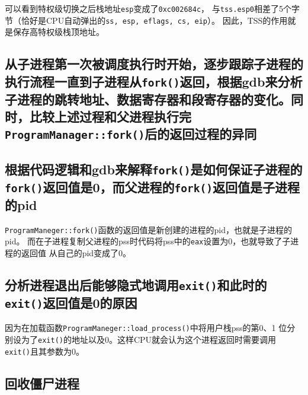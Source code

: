 可以看到特权级切换之后栈地址\texttt{esp}变成了\texttt{0xc002684c}，
与\texttt{tss.esp0}相差了5个字节（恰好是CPU自动弹出的\texttt{ss, esp, eflags, cs, eip}）。
因此，TSS的作用就是保存高特权级栈顶地址。

\subsection{从子进程第一次被调度执行时开始，逐步跟踪子进程的执行流程一直到子进程从\texttt{fork()}返回，根据gdb来分析子进程的跳转地址、数据寄存器和段寄存器的变化。同时，比较上述过程和父进程执行完\texttt{ProgramManager::fork()}后的返回过程的异同}

\subsection{根据代码逻辑和gdb来解释\texttt{fork()}是如何保证子进程的\texttt{fork()}返回值是0，而父进程的\texttt{fork()}返回值是子进程的pid}

\texttt{ProgramManeger::fork()}函数的返回值是新创建的进程的pid，也就是子进程的pid。
而在子进程复制父进程的pss时代码将pss中的\texttt{eax}设置为0，也就导致了子进程的返回值
从自己的pid变成了0。

\subsection{分析进程退出后能够隐式地调用\texttt{exit()}和此时的\texttt{exit()}返回值是0的原因}

因为在加载函数\texttt{ProgramManeger::load\_process()}中将用户栈pss的第0、1
位分别设为了\texttt{exit()}的地址以及0。这样CPU就会认为这个进程返回时需要调用
\texttt{exit()}且其参数为0。

\subsection{回收僵尸进程}